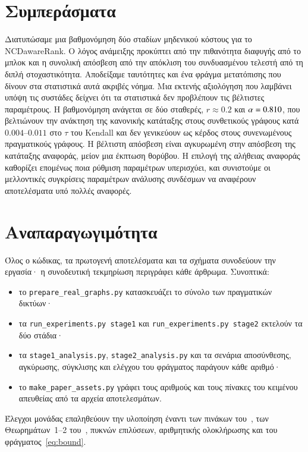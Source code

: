 \documentclass[11pt,a4paper]{article}
\theoremstyle{definition}
\theoremstyle{remark}
\begin{document}
\section{Συμπεράσματα}
\label{sec:conclusion}

Διατυπώσαμε μια βαθμονόμηση δύο σταδίων μηδενικού κόστους για το NCDawareRank. Ο λόγος ανάμειξης
προκύπτει από την πιθανότητα διαφυγής από το μπλοκ και η συνολική απόσβεση από την απόκλιση του
συνδυασμένου τελεστή από τη διπλή στοχαστικότητα. Αποδείξαμε ταυτότητες και ένα φράγμα μετατόπισης που
δίνουν στα στατιστικά αυτά ακριβές νόημα. Μια εκτενής αξιολόγηση που λαμβάνει υπόψη τις συστάδες δείχνει
ότι τα στατιστικά δεν προβλέπουν τις βέλτιστες παραμέτρους. Η βαθμονόμηση ανάγεται σε δύο σταθερές,
$r\approx0.2$ και $\alpha=0.810$, που βελτιώνουν την ανάκτηση της κανονικής κατάταξης στους
συνθετικούς γράφους κατά $0.004$--$0.011$ στο $\tau$ του Kendall και δεν γενικεύουν ως κέρδος στους
συνενωμένους πραγματικούς γράφους. Η βέλτιστη απόσβεση είναι αγκυρωμένη στην απόσβεση της κατάταξης αναφοράς, μείον μια έκπτωση
θορύβου. Η επιλογή της αλήθειας αναφοράς καθορίζει επομένως ποια ρύθμιση παραμέτρων υπερισχύει, και
συνιστούμε οι μελλοντικές συγκρίσεις παραμέτρων ανάλυσης συνδέσμων να αναφέρουν αποτελέσματα υπό
πολλές αναφορές.

\section*{Αναπαραγωγιμότητα}
Όλος ο κώδικας, τα πρωτογενή αποτελέσματα και τα σχήματα συνοδεύουν την εργασία· η συνοδευτική
τεκμηρίωση περιγράφει κάθε άρθρωμα. Συνοπτικά:
\begin{itemize}[leftmargin=1.4em,itemsep=0pt]
\item το \texttt{prepare\_real\_graphs.py} κατασκευάζει το σύνολο των πραγματικών δικτύων·
\item τα \texttt{run\_experiments.py stage1} και \texttt{run\_experiments.py stage2} εκτελούν τα δύο
στάδια·
\item τα \texttt{stage1\_analysis.py}, \texttt{stage2\_analysis.py} και τα σενάρια αποσύνθεσης,
αγκύρωσης, σύγκλισης και ελέγχου του φράγματος παράγουν κάθε αριθμό·
\item το \texttt{make\_paper\_assets.py} γράφει τους αριθμούς και τους πίνακες του κειμένου απευθείας
από τα αρχεία αποτελεσμάτων.
\end{itemize}
Έλεγχοι μονάδας επαληθεύουν την υλοποίηση έναντι των πινάκων του~\cite[Σχ.~1]{ng13}, των
Θεωρημάτων~1--2 του~\cite{ng13}, πυκνών επιλύσεων, αριθμητικής ολοκλήρωσης και του
φράγματος~\eqref{eq:bound}.
\end{document}
